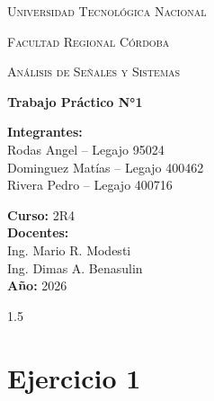 \documentclass[a4paper, 12pt]{article}
\begin{document}
\begin{titlepage}
    \centering
    {\scshape\LARGE Universidad Tecnológica Nacional \par}
    \vspace{0.3cm}
    {\scshape\Large Facultad Regional Córdoba \par}
    \vspace{1.5cm}

    {\scshape\Large Análisis de Señales y Sistemas \par}
    \vspace{0.3cm}

    {\Huge\bfseries Trabajo Práctico N°1 \par}
    \vspace{0.5cm}

    {\LARGE  \par}

    \vspace{1cm}

    \begin{flushleft}
    \textbf{Integrantes:} \\
    \quad Rodas Angel -- Legajo 95024 \\
    \quad Dominguez Matías -- Legajo 400462 \\
    \quad Rivera Pedro -- Legajo 400716\\

    \vspace{0.5cm}

    \textbf{Curso:} 2R4 \\
    \textbf{Docentes:} \\
    \quad Ing. Mario R. Modesti  \\
    \quad Ing. Dimas  A. Benasulin \\
    \textbf{Año:} 2026 \\
    \end{flushleft}

    \vfill
\end{titlepage}

\begin{spacing}{1.5} 
     \thispagestyle{plain} 
    \tableofcontents
\end{spacing}
\newpage

\section{Ejercicio 1}
\end{document}

